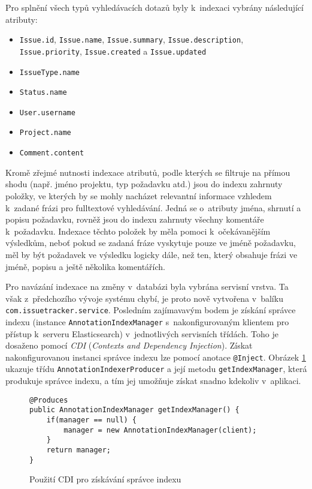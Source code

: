 \documentclass[11pt,oneside]{fithesis2}
\begin{document}
Pro splnění všech typů vyhledávacích dotazů byly k~indexaci vybrány následující atributy:
\begin{itemize}
	\item \texttt{Issue.id}, \texttt{Issue.name}, \texttt{Issue.summary}, \texttt{Issue.description}, \\ \texttt{Issue.priority}, \texttt{Issue.created} a \texttt{Issue.updated}
	\item \texttt{IssueType.name}
	\item \texttt{Status.name}
	\item \texttt{User.username}
	\item \texttt{Project.name}
	\item \texttt{Comment.content}
\end{itemize}

Kromě zřejmé nutnosti indexace atributů, podle kterých se filtruje na přímou shodu (např. jméno projektu, typ požadavku atd.) jsou do indexu zahrnuty položky, ve kterých by se mohly nacházet relevantní informace vzhledem k~zadané frázi pro fulltextové vyhledávání. Jedná se o~atributy jména, shrnutí a popisu požadavku, rovněž jsou do indexu zahrnuty všechny komentáře k~požadavku. Indexace těchto položek by měla pomoci k~očekávanějším výsledkům, neboť pokud se zadaná fráze vyskytuje pouze ve jméně požadavku, měl by být požadavek ve výsledku logicky dále, než ten, který obsahuje frázi ve jméně, popisu a ještě několika komentářích.

Pro navázání indexace na změny v~databázi byla vybrána servisní vrstva. Ta však z~předchozího vývoje systému chybí, je proto nově vytvořena v~balíku \texttt{com.issuetracker.service}. Posledním zajímavavým bodem je získání správce indexu (instance \texttt{AnnotationIndexManager} s~nakonfigurovaným klientem pro přístup k~serveru Elasticsearch) v~jednotlivých servisních třídách. Toho je dosaženo pomocí \emph{CDI} (\emph{Contexts and Dependency Injection}). Získat nakonfigurovanou instanci správce indexu lze pomocí anotace \texttt{@Inject}. Obrázek \ref{AnnotationIndexerProducer} ukazuje třídu \texttt{AnnotationIndexerProducer} a její metodu \texttt{getIndexManager}, která produkuje správce indexu, a tím jej umožňuje získat snadno kdekoliv v~aplikaci.

\begin{figure}[htb]
\begin{lstlisting}[frame=single]
@Produces
public AnnotationIndexManager getIndexManager() {
    if(manager == null) {
        manager = new AnnotationIndexManager(client);
    }
    return manager;
}
\end{lstlisting}
\caption{Použití CDI pro získávání správce indexu}
\label{AnnotationIndexerProducer}
\end{figure}
\end{document}
